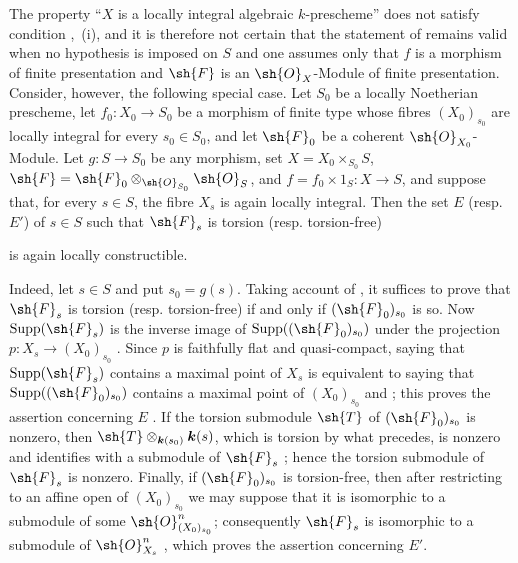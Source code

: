 \begin{remark}[9.4.9]
\label{IV.9.4.9}
The property ``$X$ is a locally integral algebraic $k$-prescheme'' does not satisfy condition ,~(i), and it is therefore not certain that the statement of  remains valid when no hypothesis is imposed on $S$ and one assumes only that $f$ is a morphism of finite presentation and $\sh{F}$ is an $\sh{O}_X$-Module of finite presentation. Consider, however, the following special case. Let $S_0$ be a locally Noetherian prescheme, let $f_0:X_0\to S_0$ be a morphism of finite type whose fibres $(X_0)_{s_0}$ are locally integral for every $s_0\in S_0$, and let $\sh{F}_0$ be a coherent $\sh{O}_{X_0}$-Module. Let $g:S\to S_0$ be any morphism, set
$X=X_0\times_{S_0}S$, $\sh{F}=\sh{F}_0\otimes_{\sh{O}_{S_0}}\sh{O}_S$, and $f=f_0\times 1_S:X\to S$, and suppose that, for every $s\in S$, the fibre $X_s$ is again locally integral. Then the set $E$ (resp. $E'$) of $s\in S$ such that $\sh{F}_s$ is torsion (resp. torsion-free)


is again locally constructible.

Indeed, let $s\in S$ and put $s_0=g(s)$. Taking account of , it suffices to prove that $\sh{F}_s$ is torsion (resp. torsion-free) if and only if $(\sh{F}_0)_{s_0}$ is so. Now $\operatorname{Supp}(\sh{F}_s)$ is the inverse image of $\operatorname{Supp}((\sh{F}_0)_{s_0})$ under the projection $p:X_s\to(X_0)_{s_0}$ . Since $p$ is faithfully flat and quasi-compact, saying that $\operatorname{Supp}(\sh{F}_s)$ contains a maximal point of $X_s$ is equivalent to saying that $\operatorname{Supp}((\sh{F}_0)_{s_0})$ contains a maximal point of $(X_0)_{s_0}$  and ; this proves the assertion concerning $E$ . If the torsion submodule $\sh{T}$ of $(\sh{F}_0)_{s_0}$ is nonzero, then $\sh{T}\otimes_{\boldsymbol{k}(s_0)}\boldsymbol{k}(s)$, which is torsion by what precedes, is nonzero and identifies with a submodule of $\sh{F}_s$ ; hence the torsion submodule of $\sh{F}_s$ is nonzero. Finally, if $(\sh{F}_0)_{s_0}$ is torsion-free, then after restricting to an affine open of $(X_0)_{s_0}$ we may suppose that it is isomorphic to a submodule of some $\sh{O}_{(X_0)_{s_0}}^n$; consequently $\sh{F}_s$ is isomorphic to a submodule of $\sh{O}_{X_s}^n$ , which proves the assertion concerning $E'$.
\end{remark}

